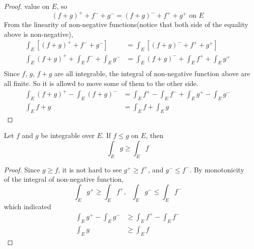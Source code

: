 \documentclass[lang=en, 12pt]{elegantbook}
\begin{document}
\begin{proof}
        value on $E$, so 
            \begin{equation*}
                (f+g)^+ + f^- +g^-  = (f+g)^- + f^+  + g^+ \mbox{ on } E
            \end{equation*}
            From the linearity of non-negative functions(notice that both side of the equality above is non-negative), 
            \begin{equation*}
                \begin{aligned}
                    \int_E [(f+g)^+ + f^- +g^-]  &= \int_E [(f+g)^- + f^+  + g^+] \\
                    \int_E (f+g)^+ + \int_E f^- +\int_E g^-  &= \int_E (f+g)^- + \int_E f^+  + \int_E g^+\\
                \end{aligned}
            \end{equation*}
            Since $f$, $g$, $f+g$ are all integrable, the integral of non-negative function above are all finite. So it is allowd to 
        move some of them to the other side.
        \begin{equation*}
            \begin{aligned}
                \int_E (f+g)^+ - \int_E (f+g)^-  &= \int_E f^+ - \int_E f^- + \int_E g^+   - \int_E g^-\\
                \int_E f+g &= \int_E f + \int_E g 
            \end{aligned}
        \end{equation*} 
        \end{proof} 
        \begin{theorem}[Monotonicity]
            Let $f$ and $g$ be integrable over $E$. If $f\leq g$ on $E$, then 
            \begin{equation*}
                \int_E g \geq \int_E f
            \end{equation*}
        \end{theorem}
        \begin{proof}
            Since $g \geq f$, it is not hard to see $g^+ \geq f^+$, and $g^- \leq f^-$. By monotonicity of the integral of non-negative
        function, 
        $$\int_E g^+ \geq \int_E f^+, \ \ \ \int_E g^- \leq \int_E f^-$$
        which indicated 
        \begin{equation*}
            \begin{aligned}
                \int_E g^+ - \int_E g^- &\geq \int_E f^+ - \int_E f^-\\
                \int_E g &\geq \int_E f
            \end{aligned}
        \end{equation*} 
        \end{proof}
\end{document}
